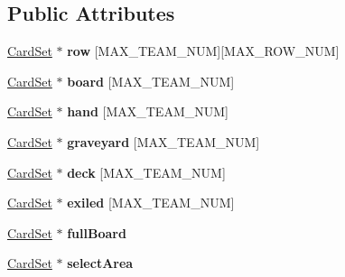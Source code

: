 \subsection*{Public Attributes}
\begin{DoxyCompactItemize}
\item 
\mbox{\label{class_field_a040ac6707c8997f46aacff6d959774f3}} 
\hyperlink{class_card_set}{Card\+Set} $\ast$ {\bfseries row} \mbox{[}M\+A\+X\+\_\+\+T\+E\+A\+M\+\_\+\+N\+UM\mbox{]}\mbox{[}M\+A\+X\+\_\+\+R\+O\+W\+\_\+\+N\+UM\mbox{]}
\item 
\mbox{\label{class_field_a2cab1602d03ca6ce1e58933e52a42794}} 
\hyperlink{class_card_set}{Card\+Set} $\ast$ {\bfseries board} \mbox{[}M\+A\+X\+\_\+\+T\+E\+A\+M\+\_\+\+N\+UM\mbox{]}
\item 
\mbox{\label{class_field_a9963affea21ffa65dbf2006670f8b719}} 
\hyperlink{class_card_set}{Card\+Set} $\ast$ {\bfseries hand} \mbox{[}M\+A\+X\+\_\+\+T\+E\+A\+M\+\_\+\+N\+UM\mbox{]}
\item 
\mbox{\label{class_field_a346b27b71eae29de9da765e12e901e09}} 
\hyperlink{class_card_set}{Card\+Set} $\ast$ {\bfseries graveyard} \mbox{[}M\+A\+X\+\_\+\+T\+E\+A\+M\+\_\+\+N\+UM\mbox{]}
\item 
\mbox{\label{class_field_a2f9231d18fb7f2d79293d84cd1c25f5a}} 
\hyperlink{class_card_set}{Card\+Set} $\ast$ {\bfseries deck} \mbox{[}M\+A\+X\+\_\+\+T\+E\+A\+M\+\_\+\+N\+UM\mbox{]}
\item 
\mbox{\label{class_field_ae78e4061ddbb02987b8bd17b8932938f}} 
\hyperlink{class_card_set}{Card\+Set} $\ast$ {\bfseries exiled} \mbox{[}M\+A\+X\+\_\+\+T\+E\+A\+M\+\_\+\+N\+UM\mbox{]}
\item 
\mbox{\label{class_field_a0be9226544c2d32e869d9f107c3c8fdb}} 
\hyperlink{class_card_set}{Card\+Set} $\ast$ {\bfseries full\+Board}
\item 
\mbox{\label{class_field_a00b15049968e7ce3a76212939a07de33}} 
\hyperlink{class_card_set}{Card\+Set} $\ast$ {\bfseries select\+Area}
\item 
\mbox{\label{class_field_aa982bf39d02fde302c53e3b0fdd7b25a}} 

\end{DoxyCompactItemize}
